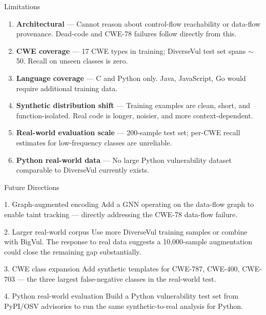\documentclass[aspectratio=169]{beamer}
\begin{document}
\begin{frame}{Limitations}
  \begin{enumerate}
    \item \textbf{Architectural} --- Cannot reason about control-flow reachability or data-flow
      provenance. Dead-code and CWE-78 failures follow directly from this.
    \item \textbf{CWE coverage} --- 17 CWE types in training; DiverseVul test set spans $\sim$50.
      Recall on unseen classes is zero.
    \item \textbf{Language coverage} --- C and Python only. Java, JavaScript, Go would require
      additional training data.
    \item \textbf{Synthetic distribution shift} --- Training examples are clean, short, and
      function-isolated. Real code is longer, noisier, and more context-dependent.
    \item \textbf{Real-world evaluation scale} --- 200-sample test set; per-CWE recall
      estimates for low-frequency classes are unreliable.
    \item \textbf{Python real-world data} --- No large Python vulnerability dataset comparable
      to DiverseVul currently exists.
  \end{enumerate}
\end{frame}

\begin{frame}{Future Directions}
  \begin{block}{1. Graph-augmented encoding}
    Add a GNN operating on the data-flow graph to enable taint tracking ---
    directly addressing the CWE-78 data-flow failure.
  \end{block}
  \begin{block}{2. Larger real-world corpus}
    Use more DiverseVul training samples or combine with BigVul.
    The response to real data suggests a 10{,}000-sample augmentation could
    close the remaining gap substantially.
  \end{block}
  \begin{block}{3. CWE class expansion}
    Add synthetic templates for CWE-787, CWE-400, CWE-703 --- the three
    largest false-negative classes in the real-world test.
  \end{block}
  \begin{block}{4. Python real-world evaluation}
    Build a Python vulnerability test set from PyPI/OSV advisories to
    run the same synthetic-to-real analysis for Python.
  \end{block}
\end{frame}
\end{document}
